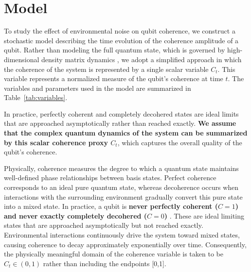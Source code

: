 \documentclass[
	a4paper, %
	10pt, %
	unnumberedsections, %
	twoside, %
]{LTJournalArticle}
\begin{document}

\section{Model}

To study the effect of environmental noise on qubit coherence, we construct a stochastic model describing the time evolution of the coherence amplitude of a qubit. Rather than modeling the full quantum state, which is governed by high-dimensional density matrix dynamics \autocite{10.1007/978-1-4419-8907-9_52}, we adopt a simplified approach in which the coherence of the system is represented by a single scalar variable 
$C_t$. This variable represents a normalized measure of the qubit’s coherence at time $t$. The variables and parameters used in the model are summarized in Table~\ref{tab:variables}.

In practice, perfectly coherent and completely decohered states are ideal limits that are approached asymptotically rather than reached exactly. \textbf{We assume that the complex quantum dynamics of the system can be summarized by this scalar coherence proxy $C_t$}, which captures the overall quality of the qubit’s coherence.

Physically, coherence measures the degree to which a quantum state maintains well-defined phase relationships between basis states. Perfect coherence corresponds to an ideal pure quantum state, whereas decoherence occurs when interactions with the surrounding environment gradually convert this pure state into a mixed state. In practice, a qubit is \textbf{never perfectly coherent ($C=1$) and never exactly completely decohered ($C=0$)} \autocite{wodkiewicz2001stochastic, nielsen2010quantum}. These are ideal limiting states that are approached asymptotically but not reached exactly. Environmental interactions continuously drive the system toward mixed states, causing coherence to decay approximately exponentially over time. Consequently, the physically meaningful domain of the coherence variable is taken to be \textbf{$C_t \in (0,1)$} rather than including the endpoints [0,1].
\end{document}
